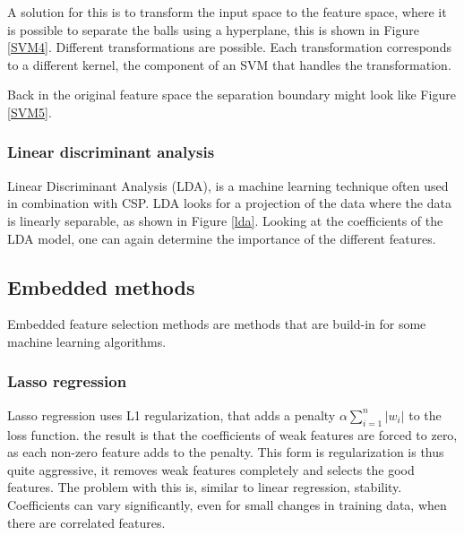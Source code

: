 A solution for this is to transform the input space to the feature space, where it is possible to separate the balls using a hyperplane, this is shown in Figure \ref{SVM4}. Different transformations are possible. Each transformation corresponds to a different kernel, the component of an SVM that handles the transformation.


Back in the original feature space the separation boundary might look like Figure \ref{SVM5}.


\subsubsection{Linear discriminant analysis}
Linear Discriminant Analysis (LDA), is a machine learning technique often used in combination with CSP\cite{ErrorPotentials,svmldacomp,currTrends}. LDA looks for a projection of the data where the data is linearly separable, as shown in Figure \ref{lda}. Looking at the coefficients of the LDA model, one can again determine the importance of the different features.


\subsection{Embedded methods}
Embedded feature selection methods are methods that are build-in for some machine learning algorithms.

\subsubsection{Lasso regression}
Lasso regression uses L1 regularization, that adds a penalty $\alpha\sum\limits_{i=1}^{n} |w_i|$ to the loss function. the result is that the coefficients of weak features are forced to zero, as each non-zero feature adds to the penalty. This form is regularization is thus quite aggressive, it removes weak features completely and selects the good features. The problem with this is, similar to linear regression, stability. Coefficients can vary significantly, even for small changes in training data, when there are correlated features.

